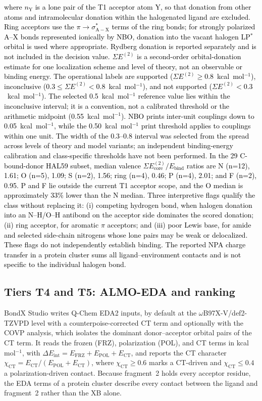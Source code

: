\documentclass[journal=jcisd8,manuscript=article,layout=two-column]{achemso}
\newcommand{\tcb}[1]{{\textcolor{black}{#1}}}
\newcommand{\BX}{BondX Studio}
\newcommand{\kcal}{kcal\,mol$^{-1}$}
\begin{document}
\tcb{where $n_\mathrm{Y}$ is a lone pair of the T1 acceptor atom Y, so that donation from other atoms and intramolecular donation within the halogenated ligand are excluded. Ring acceptors use the $\pi\to\sigma^*_{\mathrm{A-X}}$ terms of the ring bonds; for strongly polarized A--X bonds represented ionically by NBO, donation into the vacant halogen LP$^*$ orbital is used where appropriate. Rydberg donation is reported separately and is not included in the decision value. $\Sigma E^{(2)}$ is a second-order orbital-donation estimate for one localization scheme and level of theory, not an observable or binding energy. The operational labels are supported ($\Sigma E^{(2)}\geq0.8$~kcal~mol$^{-1}$), inconclusive ($0.3\leq\Sigma E^{(2)}<0.8$~kcal~mol$^{-1}$), and not supported ($\Sigma E^{(2)}<0.3$~kcal~mol$^{-1}$). The selected 0.5~kcal~mol$^{-1}$ reference value lies within the inconclusive interval; it is a convention, not a calibrated threshold or the arithmetic midpoint (0.55~kcal~mol$^{-1}$). NBO prints inter-unit couplings down to 0.05~kcal~mol$^{-1}$, while the 0.50~kcal~mol$^{-1}$ print threshold applies to couplings within one unit. The width of the 0.3--0.8 interval was selected from the spread across levels of theory and model variants; an independent binding-energy calibration and class-specific thresholds have not been performed. In the 29 C-bound-donor HAL59 subset, median valence $\Sigma E^{(2)}_{\mathrm{core}}/E_{\mathrm{bind}}$ ratios are N (n=12), 1.61; O (n=5), 1.09; S (n=2), 1.56; ring (n=4), 0.46; P (n=4), 2.01; and F (n=2), 0.95. P and F lie outside the current T1 acceptor scope, and the O median is approximately 33\% lower than the N median. Three interpretive flags qualify the class without replacing it: (i) competing hydrogen bond, when halogen donation into an N--H/O--H antibond on the acceptor side dominates the scored donation; (ii) ring acceptor, for aromatic $\pi$ acceptors; and (iii) poor Lewis base, for amide and selected side-chain nitrogens whose lone pairs may be weak or delocalized. These flags do not independently establish binding. The reported NPA charge transfer in a protein cluster sums all ligand--environment contacts and is not specific to the individual halogen bond.}



\subsection{Tiers T4 and T5: ALMO-EDA and ranking}
\BX{} writes Q-Chem EDA2 inputs,\cite{Horn2016,Epifanovsky2021} by default at the $\omega$B97X-V/def2-TZVPD level with a counterpoise-corrected CT term and optionally with the COVP analysis, which isolates the dominant donor--acceptor orbital pairs of the CT term.\cite{Khaliullin2008COVP} It reads the frozen (FRZ), polarization (POL), and CT terms in \kcal{}, with $\Delta E_\mathrm{int}=E_\mathrm{FRZ}+E_\mathrm{POL}+E_\mathrm{CT}$, and reports the CT character $\chi_\mathrm{CT}=E_\mathrm{CT}/(E_\mathrm{POL}+E_\mathrm{CT})$, where $\chi_\mathrm{CT}\ge0.6$ marks a CT-driven and $\chi_\mathrm{CT}\le0.4$ a polarization-driven contact. Because fragment~2 holds every acceptor residue, the EDA terms of a protein cluster describe every contact between the ligand and fragment~2 rather than the XB alone.
\end{document}
